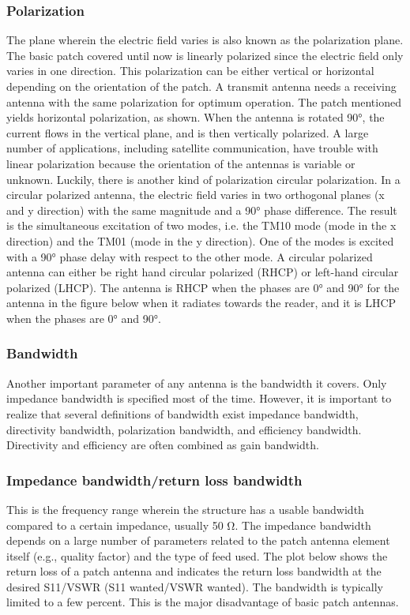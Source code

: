 \documentclass[12pt]{article}
\begin{document}
          \subsubsection{Polarization}\label{sub:Polarization}
           \justify
            The plane wherein the electric field varies is also known as the polarization plane. The
            basic patch covered until now is linearly polarized since the electric field only varies in one
            direction. This polarization can be either vertical or horizontal depending on the orientation of the patch. A transmit antenna needs a receiving antenna with the same polarization for optimum operation. The patch mentioned yields horizontal polarization, as shown. When the antenna is rotated 90°, the current flows in the vertical plane, and is then vertically polarized. A large number of applications, including satellite communication, have trouble with linear polarization because the orientation of the antennas is variable or unknown. Luckily, there is another kind of polarization circular polarization. In a circular polarized antenna, the electric field varies in two orthogonal planes (x and y direction) with the same magnitude and a 90° phase difference. The result is the simultaneous excitation of two modes, i.e. the TM10 mode (mode in the x direction) and the TM01 (mode in the y direction). One of the modes is excited with a 90° phase delay with respect to the other mode. A circular polarized antenna can either be right hand circular polarized (RHCP) or left-hand circular polarized (LHCP). The antenna is RHCP when the phases are 0° and 90° for the antenna in the figure below when it radiates towards the reader, and it is LHCP when the phases are 0° and 90°.

            \subsubsection{Bandwidth}
			 \justify
              Another important parameter of any antenna is the bandwidth it covers. Only impedance bandwidth is specified most of the time. However, it is important to realize that several definitions of bandwidth exist impedance bandwidth, directivity bandwidth, polarization bandwidth, and efficiency bandwidth. Directivity and efficiency are often combined as gain bandwidth.

            \subsubsection{Impedance bandwidth/return loss bandwidth}\label{  Impedance bandwidth/return loss bandwidth}
			  \justify
                This is the frequency range wherein the structure has a usable bandwidth compared to a certain impedance, usually 50 Ω. The impedance bandwidth depends on a large number of
                parameters related to the patch antenna element itself (e.g., quality factor) and the type of feed used. The plot below shows the return loss of a patch antenna and indicates the return loss bandwidth at the desired S11/VSWR (S11 wanted/VSWR wanted). The bandwidth is typically  limited to a few percent. This is the major disadvantage of basic patch antennas.
\end{document}
